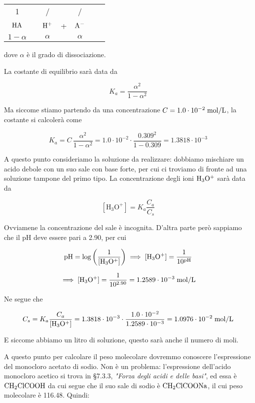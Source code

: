 \begin{center}
    \begin{tabular}{ccccccc}
        1 & & / & & /\\
        $\rm HA$ & \ce{<-->} & $\rm H^+$ & + & $\rm A^-$\\
        $1- \alpha$ & & $\alpha$ & & $\alpha$\\
    \end{tabular}
\end{center}

dove $\alpha$ è il grado di dissociazione.

La costante di equilibrio sarà data da

$$K_a=\frac{\alpha^2}{1-\alpha^2}$$

Ma siccome stiamo partendo da una concentrazione $C=1.0 \cdot 10^{-2} \; \rm mol/L$, la costante si calcolerà come

$$K_a=C\,\frac{\alpha^2}{1-\alpha^2}
=1.0 \cdot 10^{-2} \cdot \frac{0.309^2}{1-0.309}
=1.3818 \cdot 10^{-3}$$

A questo punto consideriamo la soluzione da realizzare: dobbiamo mischiare un acido debole con un suo sale con base forte, per cui ci troviamo di fronte ad una soluzione tampone del primo tipo. La concentrazione degli ioni $\rm H_3O^+$ sarà data da

$$[\text{H}_3\text{O}^+] = K_a \frac{C_a}{C_s}$$

Ovviamene la concentrazione del sale è incognita. D'altra parte però sappiamo che il pH deve essere pari a 2.90, per cui 

$$\rm pH=\log{\left(\frac{1}{[H_3O^+]}\right)}
\implies
[H_3O^+]=\frac{1}{10^{pH}}$$

$$\implies
\rm [H_3O^+]=\frac{1}{10^{2.90}}
=1.2589 \cdot 10^{-3} \; \rm mol/L$$

Ne segue che

$$C_s=K_a\frac{C_a}{\rm [H_3O^+]}
=1.3818 \cdot 10^{-3} \cdot \frac{1.0 \cdot 10^{-2}}{1.2589 \cdot 10^{-3}}
=1.0976 \cdot 10^{-2} \; \rm mol/L$$

E siccome abbiamo un litro di soluzione, questo sarà anche il numero di moli.

A questo punto per calcolare il peso molecolare dovremmo conoscere l'espressione del monocloro acetato di sodio. Non è un problema: l'espressione dell'acido monocloro acetico si trova in §7.3.3, \textit{"Forza degli acidi e delle basi"}, ed essa è $\rm CH_2ClCOOH$ da cui segue che il suo sale di sodio è $\rm CH_2ClCOONa$, il cui peso molecolare è 116.48. Quindi:

